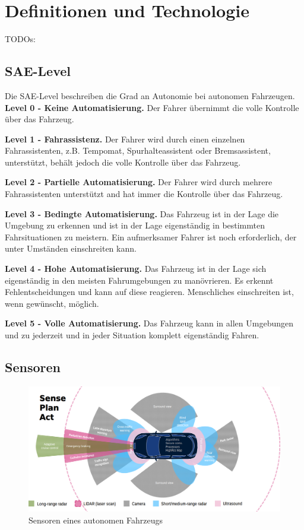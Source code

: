 

\section{Definitionen und Technologie}
\label{sec:definitionen-und-technologie}

TODOs:

\subsection{SAE-Level}
\label{ssec:sae-level}

Die SAE-Level \cite{standardSAE} beschreiben die Grad an Autonomie bei autonomen Fahrzeugen.\\

\textbf{Level 0 - Keine Automatisierung.} Der Fahrer übernimmt die volle Kontrolle über das Fahrzeug.

\textbf{Level 1 - Fahrassistenz.} Der Fahrer wird durch einen einzelnen Fahrassistenten, z.B. Tempomat, Spurhalteassistent oder Bremsassistent, unterstützt, behält jedoch die volle Kontrolle über das Fahrzeug.

\textbf{Level 2 - Partielle Automatisierung.} Der Fahrer wird durch mehrere Fahrassistenten unterstützt and hat immer die Kontrolle über das Fahrzeug.
    
\textbf{Level 3 - Bedingte Automatisierung.}
Das Fahrzeug ist in der Lage die Umgebung zu erkennen und ist in der Lage eigenständig in bestimmten Fahrsituationen zu meistern. Ein aufmerksamer Fahrer ist noch erforderlich, der unter Umständen einschreiten kann.

\textbf{Level 4 - Hohe Automatisierung.} Das Fahrzeug ist in der Lage sich eigenständig in den meisten Fahrumgebungen zu manövrieren. Es erkennt Fehlentscheidungen und kann auf diese reagieren. Menschliches einschreiten ist, wenn gewünscht, möglich.

\textbf{Level 5 - Volle Automatisierung.} Das Fahrzeug kann in allen Umgebungen und zu jederzeit und in jeder Situation komplett eigenständig Fahren.

\subsection{Sensoren}


\begin{figure}[H]
    \centering
    \includegraphics[width=.485\textwidth]{resources/images/sensors.png}
    \caption{Sensoren eines autonomen Fahrzeugs \cite{smith2015automated}}
\end{figure}



